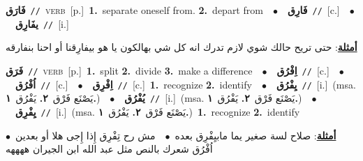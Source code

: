 \documentclass[10pt,a4paper,twoside]{article} %
\begin{document}
\begin{multicols}{2}
{\setlength\topsep{0pt}\textbf{\foreignlanguage{arabic}{فَارَق}}\ {\color{gray}\texttt{//}\color{black}}\ \textsc{verb}\ [p.]\ \textbf{1.}~separate oneself from.  \textbf{2.}~depart from\ \ $\bullet$\ \ \setlength\topsep{0pt}\textbf{\foreignlanguage{arabic}{فَارِق}}\ {\color{gray}\texttt{//}\color{black}}\ [c.]\ \ $\bullet$\ \ \setlength\topsep{0pt}\textbf{\foreignlanguage{arabic}{يفَارِق}}\ {\color{gray}\texttt{//}\color{black}}\ [i.]\  \begin{flushright}\color{gray}\foreignlanguage{arabic}{\textbf{\underline{\foreignlanguage{arabic}{أمثلة}}}: حتى تريح حالك شوي لازم تدرك انه كل شي بهالكون يا هو بيفارِقنا أو احنا بنفارقه}\end{flushright}\color{black}} \vspace{2mm}

{\setlength\topsep{0pt}\textbf{\foreignlanguage{arabic}{فَرَق}}\ {\color{gray}\texttt{//}\color{black}}\ \textsc{verb}\ [p.]\ \textbf{1.}~split  \textbf{2.}~divide  \textbf{3.}~make a difference\ \ $\bullet$\ \ \setlength\topsep{0pt}\textbf{\foreignlanguage{arabic}{اِفْرُق}}\ {\color{gray}\texttt{//}\color{black}}\ [c.]\ \ $\bullet$\ \ \setlength\topsep{0pt}\textbf{\foreignlanguage{arabic}{اُفْرُق}}\ {\color{gray}\texttt{//}\color{black}}\ [c.]\ \ $\bullet$\ \ \setlength\topsep{0pt}\textbf{\foreignlanguage{arabic}{اِفْرِق}}\ {\color{gray}\texttt{//}\color{black}}\ [c.]\ \textbf{1.}~recognize  \textbf{2.}~identify\ \ $\bullet$\ \ \setlength\topsep{0pt}\textbf{\foreignlanguage{arabic}{يِفْرُق}}\ {\color{gray}\texttt{//}\color{black}}\ [i.]\ \color{gray}(msa. \foreignlanguage{arabic}{يَصْنَع فَرْق}~\foreignlanguage{arabic}{\textbf{٢.}}  \foreignlanguage{arabic}{يَفْرُق}~\foreignlanguage{arabic}{\textbf{١.}})\color{black}\ \ $\bullet$\ \ \setlength\topsep{0pt}\textbf{\foreignlanguage{arabic}{يُفْرُق}}\ {\color{gray}\texttt{//}\color{black}}\ [i.]\ \color{gray}(msa. \foreignlanguage{arabic}{يَصْنَع فَرْق}~\foreignlanguage{arabic}{\textbf{٢.}}  \foreignlanguage{arabic}{يَفْرُق}~\foreignlanguage{arabic}{\textbf{١.}})\color{black}\ \ $\bullet$\ \ \setlength\topsep{0pt}\textbf{\foreignlanguage{arabic}{يِفْرِق}}\ {\color{gray}\texttt{//}\color{black}}\ [i.]\ \color{gray}(msa. \foreignlanguage{arabic}{يَصْنَع فَرْق}~\foreignlanguage{arabic}{\textbf{٢.}}  \foreignlanguage{arabic}{يَفْرُق}~\foreignlanguage{arabic}{\textbf{١.}})\color{black}\ \textbf{1.}~recognize  \textbf{2.}~identify\  \begin{flushright}\color{gray}\foreignlanguage{arabic}{\textbf{\underline{\foreignlanguage{arabic}{أمثلة}}}: صلاح لسة صغير يما مابيِفْرِق بعده\ $\bullet$\ \  مش رح تِفْرِق إِذا إِجى هلا أو بعدين\ $\bullet$\ \  اُفْرُق شعرك بالنص مثل عبد الله ابن الجيران ههههه}\end{flushright}\color{black}} \vspace{2mm}


\end{multicols}
\end{document}
